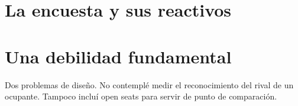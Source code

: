 \documentclass[letter,12pt]{article}
\begin{document}






\section{La encuesta y sus reactivos}

\section{Una debilidad fundamental}

Dos problemas de diseño. No contemplé medir el reconocimiento del rival de un ocupante. Tampoco incluí open seats para servir de punto de comparación. 
\end{document}
